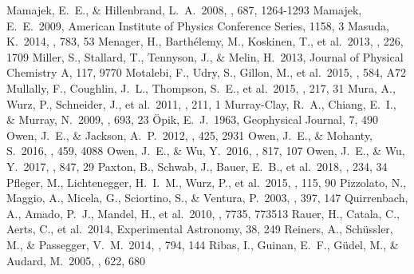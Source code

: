 \documentclass{aa}
\begin{document}
\begin{thebibliography}{}
    Mamajek, E.~E., \& Hillenbrand, L.~A.\ 2008, \apj, 687, 1264-1293
    Mamajek, E.~E.\ 2009, American Institute of Physics Conference Series, 1158, 3
    Masuda, K.\ 2014, \apj, 783, 53
    Menager, H., Barth{\'e}lemy, M., Koskinen, T., et al.\ 2013, \icarus, 226, 1709
    Miller, S., Stallard, T., Tennyson, J., \& Melin, H.\ 2013, Journal of          Physical Chemistry A, 117, 9770
    Motalebi, F., Udry, S., Gillon, M., et al.\ 2015, \aap, 584, A72
    Mullally, F., Coughlin, J.~L., Thompson, S.~E., et al.\ 2015, \apjs,            217, 31
    Mura, A., Wurz, P., Schneider, J., et al.\ 2011, \icarus, 211, 1
    Murray-Clay, R.~A., Chiang, E.~I., \& Murray, N.\ 2009, \apj, 693, 23
    {\"O}pik, E.~J.\ 1963, Geophysical Journal, 7, 490
    Owen, J.~E., \& Jackson, A.~P.\ 2012, \mnras, 425, 2931
    Owen, J.~E., \& Mohanty, S.\ 2016, \mnras, 459, 4088
    Owen, J.~E., \& Wu, Y.\ 2016, \apj, 817, 107
    Owen, J.~E., \& Wu, Y.\ 2017, \apj, 847, 29
Paxton, B., Schwab, J., Bauer, E.~B., et al.\ 2018, \apjs, 234, 34
    Pfleger, M., Lichtenegger, H.~I.~M., Wurz, P., et al.\ 2015, \planss, 115, 90
    Pizzolato, N., Maggio, A., Micela, G., Sciortino, S., \& Ventura, P.\ 2003, \aap, 397, 147
    Quirrenbach, A., Amado, P.~J., Mandel, H., et al.\ 2010, \procspie,             7735, 773513
    Rauer, H., Catala, C., Aerts, C., et al.\ 2014, Experimental Astronomy,         38, 249
    Reiners, A., Sch{\"u}ssler, M., \& Passegger, V.~M.\ 2014, \apj, 794,           144
    Ribas, I., Guinan, E.~F., G{\"u}del, M., \& Audard, M.\ 2005, \apj, 622, 680

\end{thebibliography}
\end{document}
